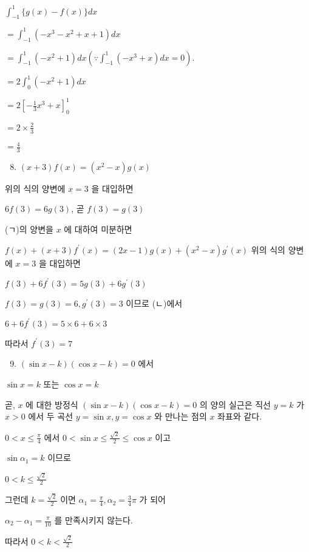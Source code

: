 \documentclass[10pt]{article}
\begin{document}
$\int_{-1}^{1}\{g(x)-f(x)\} d x$

$=\int_{-1}^{1}\left(-x^{3}-x^{2}+x+1\right) d x$

$=\int_{-1}^{1}\left(-x^{2}+1\right) d x\left(\because \int_{-1}^{1}\left(-x^{3}+x\right) d x=0\right)$.

$=2 \int_{0}^{1}\left(-x^{2}+1\right) d x$

$=2\left[-\frac{1}{3} x^{3}+x\right]_{0}^{1}$

$=2 \times \frac{2}{3}$

$=\frac{4}{3}$

\begin{enumerate}
  \setcounter{enumi}{7}
  \item $(x+3) f(x)=\left(x^{2}-x\right) g(x)$
\end{enumerate}

위의 식의 양변에 $x=3$ 을 대입하면

$6 f(3)=6 g(3)$, 곧 $f(3)=g(3)$

(ㄱ)의 양변을 $x$ 에 대하여 미분하면

$f(x)+(x+3) f^{\prime}(x)=(2 x-1) g(x)+\left(x^{2}-x\right) g^{\prime}(x)$ 위의 식의 양변에 $x=3$ 을 대입하면

$f(3)+6 f^{\prime}(3)=5 g(3)+6 g^{\prime}(3)$

$f(3)=g(3)=6, g^{\prime}(3)=3$ 이므로 (ㄴ)에서

$6+6 f^{\prime}(3)=5 \times 6+6 \times 3$

따라서 $f^{\prime}(3)=7$

\begin{enumerate}
  \setcounter{enumi}{8}
  \item $(\sin x-k)(\cos x-k)=0$ 에서
\end{enumerate}

$\sin x=k$ 또는 $\cos x=k$

곧, $x$ 에 대한 방정식 $(\sin x-k)(\cos x-k)=0$ 의 양의 실근은 직선 $y=k$ 가 $x>0$ 에서 두 곡선 $y=\sin x, y=\cos x$ 와 만나는 점의 $x$ 좌표와 같다.

$0<x \leq \frac{\pi}{4}$ 에서 $0<\sin x \leq \frac{\sqrt{2}}{2} \leq \cos x$ 이고

$\sin \alpha_{1}=k$ 이므로

$0<k \leq \frac{\sqrt{2}}{2}$

그런데 $k=\frac{\sqrt{2}}{2}$ 이면 $\alpha_{1}=\frac{\pi}{4}, \alpha_{2}=\frac{3}{4} \pi$ 가 되어

$\alpha_{2}-\alpha_{1}=\frac{\pi}{10}$ 를 만족시키지 않는다.

따라서 $0<k<\frac{\sqrt{2}}{2}$
\end{document}
